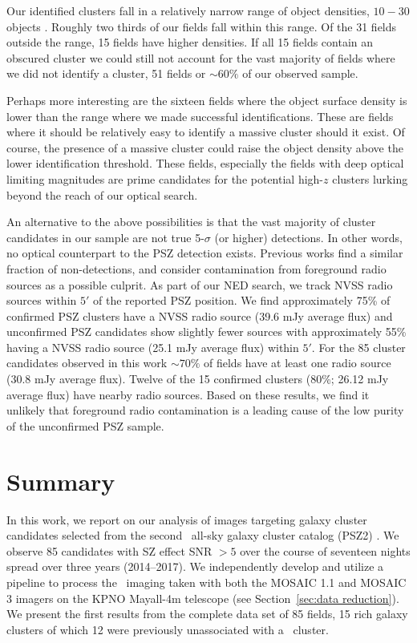 \documentclass[apj, revtex4-1]{emulateapj}
\begin{document}
Our identified clusters fall in a relatively narrow range of object densities, $10-30$ objects \perarcminsq. Roughly two thirds of our fields fall within this range. Of the 31 fields outside the range, 15 fields have higher densities. If all 15 fields contain an obscured cluster we could still not account for the vast majority of fields where we did not identify a cluster, 51 fields or $\sim60\%$ of our observed sample.

Perhaps more interesting are the sixteen fields where the object surface density is lower than the range where we made successful identifications. These are fields where it should be relatively easy to identify a massive cluster should it exist. Of course, the presence of a massive cluster could raise the object density above the lower identification threshold. These fields, especially the fields with deep optical limiting magnitudes are prime candidates for the potential high-$z$ clusters lurking beyond the reach of our optical search.

An alternative to the above possibilities is that the vast majority of cluster candidates in our sample are not true 5-$\sigma$ (or higher) detections.	In other words, no optical counterpart to the PSZ detection exists. Previous works  find a similar fraction of non-detections, and consider contamination from foreground radio sources as a possible culprit. As part of our NED search, we track NVSS radio sources within $5'$ of the reported PSZ position. We find approximately 75\% of confirmed PSZ clusters have a NVSS radio source (39.6 mJy average flux) and unconfirmed PSZ candidates show slightly fewer sources with approximately 55\% having a NVSS radio source (25.1 mJy average flux) within $5'$. For the 85 cluster candidates observed in this work $\sim70\%$ of fields have at least one radio source (30.8 mJy average flux). Twelve of the 15 confirmed clusters (80\%; 26.12 mJy average flux) have nearby radio sources. Based on these results, we find it unlikely that foreground radio contamination is a leading cause of the low purity of the unconfirmed PSZ sample.

\section{Summary}\label{sec:summary}
In this work, we report on our analysis of images targeting galaxy cluster candidates selected from the second \planck\ all-sky galaxy cluster catalog (PSZ2) \citep{PlanckCollaboration2015a}. We observe 85 candidates with SZ effect SNR $>5$ over the course of seventeen nights spread over three years (2014--2017). We independently develop and utilize a pipeline to process the \sdssg\sdssr\sdssi\sdssz\ imaging taken with both the MOSAIC 1.1 and MOSAIC 3 imagers on the KPNO Mayall-4m telescope (see Section~\ref{sec:data reduction}). We present the first results from the complete data set of 85 fields, 15 rich galaxy clusters of which 12 were previously unassociated with a \planck\ cluster.
\end{document}
